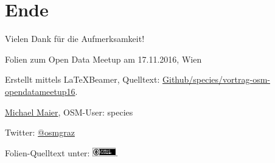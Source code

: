 \documentclass{beamer}
\begin{document}
\section{Ende}

\begin{frame}{Vielen Dank für die Aufmerksamkeit!}

  Folien zum Open Data Meetup am 17.11.2016, Wien
\vspace{1cm}

Erstellt mittels \LaTeX Beamer, Quelltext: \href{https://github.com/species/vortrag-osm-opendatameetup16}{Github/species/vortrag-osm-opendatameetup16}.
\vspace{1cm}

\href{mailto:Michael.Maier@student.tugraz.at}{Michael Maier}, OSM-User: species

Twitter: \href{https://twitter.com/osmgraz}{@osmgraz}
\vspace{1cm}

Folien-Quelltext unter: \includegraphics[width=1cm]{cc-zero.pdf}. 

\end{frame}
\end{document}
